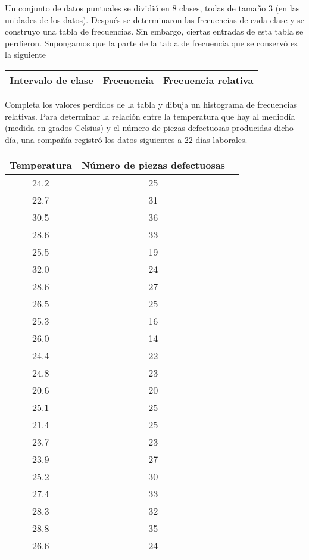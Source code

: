 \documentclass{exam}
\begin{document}
\begin{questions}
\question Un conjunto de datos puntuales se dividió en 8 clases, todas de tamaño 3 (en las unidades de los datos). Después se determinaron las frecuencias de cada clase y se construyo una tabla de frecuencias. Sin embargo, ciertas entradas de esta tabla se perdieron. Supongamos que la parte de la tabla de frecuencia que se conservó es la siguiente
\begin{table}[H]
	\centering
	\begin{tabular}{|c|c|c|}
		\hline
		Intervalo de clase & Frecuencia & Frecuencia relativa\\
		\hline
	\end{tabular}
\end{table}
Completa los valores perdidos de la tabla y dibuja un histograma de frecuencias relativas.
\question Para determinar la relación entre la temperatura que hay al mediodía (medida en grados Celsius) y el número de piezas defectuosas producidas dicho día, una compañía registró los datos siguientes a 22 días laborales.
\begin{table}[H]
	\centering
	\begin{tabular}{|c|c|c|}
		\hline
		Temperatura & Número de piezas defectuosas\\
		\hline
		24.2 & 25\\
		\hline
		22.7 &  31\\
		\hline
		30.5 & 36\\
		\hline
		28.6 & 33\\
		\hline
		25.5 & 19\\
		\hline
		32.0 & 24\\
		\hline
		28.6 & 27\\
		\hline
		26.5 & 25\\
		\hline
		25.3 & 16\\
		\hline
		26.0 & 14\\
		\hline
		24.4 & 22\\
		\hline
		24.8 & 23\\
		\hline
		20.6 & 20\\
		\hline
		25.1 & 25\\
		\hline
		21.4 & 25\\
		\hline
		23.7 & 23\\
		\hline
		23.9 & 27\\
		\hline
		25.2 & 30\\
		\hline
		27.4 & 33\\
		\hline
		28.3 & 32\\
		\hline
		28.8 & 35\\
		\hline
		26.6 & 24\\
		\hline
	\end{tabular}
\end{table}
\begin{parts}

\end{parts}
\end{questions}
\end{document}
